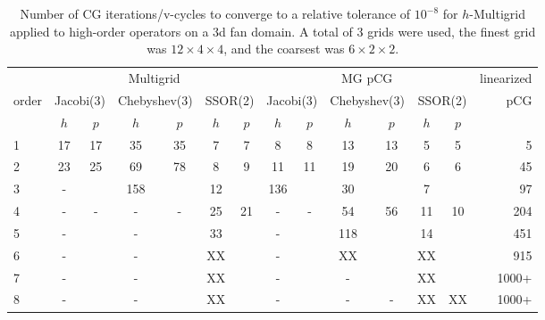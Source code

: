 \begin{table}
  \caption{\label{tab:fan3} Number of CG iterations/v-cycles to converge to a relative tolerance of $10^{-8}$ for $h$-Multigrid applied to high-order operators on a 3d fan domain. A total of 3 grids were used, the finest grid was $12\times 4\times 4$, and the coarsest was $6\times 2\times 2$.}
		\centering
    \begin{tabular}{|l|c|c|c|c|c|c|c|c|c|c|c|c|r|} 
	    \hline
						        & \multicolumn{6}{c|}{Multigrid} & \multicolumn{6}{c|}{MG pCG} &          linearized \\
																 \cline{2-13}
									order &  \multicolumn{2}{c|}{\scriptsize  Jacobi(3)} &  \multicolumn{2}{c|}{\scriptsize Chebyshev(3)} & \multicolumn{2}{c|}{\scriptsize  SSOR(2)} & \multicolumn{2}{c|}{\scriptsize Jacobi(3)} &  \multicolumn{2}{c|}{\scriptsize Chebyshev(3)} & \multicolumn{2}{c|}{\scriptsize SSOR(2)} & pCG\\
						\hline
						 & $h$ & $p$ & $h$ & $p$& $h$ & $p$& $h$ & $p$& $h$ & $p$& $h$ & $p$& \\
						 \cline{2-13}
						 
1 &  17  & 17 &  35  & 35  & 7   &  7  & 8   &  8  & 13  & 13  & 5  &  5   &   5 \\
2 &  23  & 25 &  69  & 78  & 8   &  9  & 11  &  11 & 19  & 20  & 6  &  6   &  45 \\  
3 &  -   &    &  158 &     & 12  &     & 136 &     & 30  &     & 7  &      &  97 \\
4 &  -   & -  &   -  &  -  & 25  & 21  &  -  &  -  & 54  & 56  & 11 & 10   & 204 \\
5 &  -   &    &   -  &     & 33  &     &  -  &     & 118 &     & 14 &      & 451 \\ 
6 &  -   &    &   -  &     & XX  &     &  -  &     & XX  &     & XX &      & 915 \\ 
7 &  -   &    &   -  &     & XX  &     &  -  &     &  -  &     & XX &      & 1000+ \\ 
8 &  -   &    &   -  &     & XX  &     &  -  &     &  -  &  -  & XX &  XX  & 1000+ \\ 
			\hline
	  \end{tabular}
\end{table}
% 
